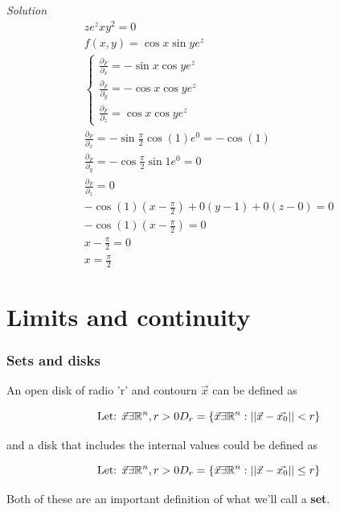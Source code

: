 \documentclass[11pt,fleqn]{book} %
\begin{document}
\textit{Solution}
\begin{gather}
    z e^z x y^2 = 0 \\
    f(x,y) = \cos x \sin y e^z \\
    \begin{cases}
    \frac{\partial_F}{\partial_x} = - \sin x \cos y e^z  \\
    \frac{\partial_F}{\partial_y} = - \cos x \cos y e^z \\
    \frac{\partial_F}{\partial_z} =  \cos x \cos y e^z
    \end{cases} \\
    \frac{\partial_F}{\partial_x} = - \sin \frac{\pi}{2} \cos (1) e^0 = - \cos (1)\\
    \frac{\partial_F}{\partial_y} = - \cos \frac{\pi}{2} \sin 1 e^0 = 0 \\
    \frac{\partial_F}{\partial_z} = 0 \\
    - \cos(1) (x - \frac{\pi}{2}) + 0(y-1) + 0(z-0) = 0 \\
    - \cos (1) (x - \frac{\pi}{2}) = 0 \\
    x - \frac{\pi}{2} = 0\\
    x = \frac{\pi}{2}
\end{gather}


\chapter{Limits and continuity}
\subsection*{Sets and disks}
An open disk of radio 'r' and contourn $\vec{x}$ can be defined as


\begin{equation}
    \text{Let: }\vec{x}\exists\mathbb{R}^n , r > 0 \\ D_r = \{ \vec{x} \exists \mathbb{R}^n: ||\vec{x} - \vec{x_0} || < r \}
\end{equation}

and a disk that includes the internal values could be defined as 

\begin{equation}
    \text{Let: }\vec{x}\exists\mathbb{R}^n , r > 0 \\ D_r = \{ \vec{x} \exists \mathbb{R}^n: ||\vec{x} - \vec{x_0} || \le r \}
\end{equation}

Both of these are an important definition of what we'll call a \textbf{set}. 
\end{document}
